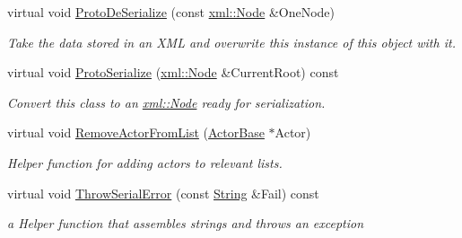 \begin{DoxyCompactItemize}
virtual void \hyperlink{classMezzanine_1_1AreaEffect_a42194d495d73b76497cf804fadcb327d}{ProtoDeSerialize} (const \hyperlink{classMezzanine_1_1xml_1_1Node}{xml::Node} \&OneNode)
\begin{DoxyCompactList}\small\item\em Take the data stored in an XML and overwrite this instance of this object with it. \item\end{DoxyCompactList}\item 
virtual void \hyperlink{classMezzanine_1_1AreaEffect_a15ea11f3f0c1998f775c2b92d2941cc8}{ProtoSerialize} (\hyperlink{classMezzanine_1_1xml_1_1Node}{xml::Node} \&CurrentRoot) const 
\begin{DoxyCompactList}\small\item\em Convert this class to an \hyperlink{classMezzanine_1_1xml_1_1Node}{xml::Node} ready for serialization. \item\end{DoxyCompactList}\item 
\hypertarget{classMezzanine_1_1AreaEffect_a676a36ba3fb8b0d7ced951f1b5010852}{
virtual void \hyperlink{classMezzanine_1_1AreaEffect_a676a36ba3fb8b0d7ced951f1b5010852}{RemoveActorFromList} (\hyperlink{classMezzanine_1_1ActorBase}{ActorBase} $\ast$Actor)}
\label{classMezzanine_1_1AreaEffect_a676a36ba3fb8b0d7ced951f1b5010852}

\begin{DoxyCompactList}\small\item\em Helper function for adding actors to relevant lists. \item\end{DoxyCompactList}\item 
virtual void \hyperlink{classMezzanine_1_1AreaEffect_acb6f2cb173aa78725d82d5d33af5b866}{ThrowSerialError} (const \hyperlink{namespaceMezzanine_acf9fcc130e6ebf08e3d8491aebcf1c86}{String} \&Fail) const 
\begin{DoxyCompactList}\small\item\em a Helper function that assembles strings and throws an exception \item\end{DoxyCompactList}\end{DoxyCompactItemize}
